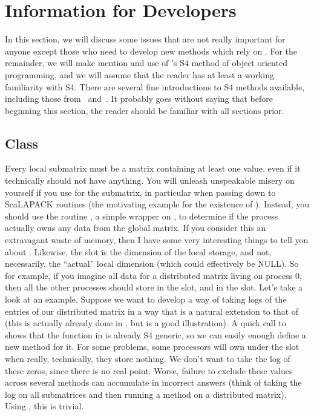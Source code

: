\section[]{Information for Developers}
\label{sec:devs}

In this section, we will discuss some issues that are not really important for anyone except those who need to develop new methods which rely on .  For the remainder, we will make mention and use of 's S4 method of object oriented programming, and we will assume that the reader has at least a working familiarity with S4.  There are several fine introductions to S4 methods available, including those from~\citep{s4chambers} and~\citep{s4notsoshort}.  It probably goes without saying that before beginning this section, the reader should be familiar with all sections prior.

\subsection[]{Class }
\label{sec:ictxt}

Every local submatrix must be a matrix containing at least one value, even if it technically should not have anything.  You will unleash unspeakable misery on yourself if you use  for the submatrix, in particular when passing down to ScaLAPACK routines (the motivating example for the existence of ).  Instead, you should use the routine , a simple wrapper on , to determine if the process actually owns any data from the global matrix.  If you consider this an extravagant waste of memory, then I have some very interesting things to tell you about .
\np
Likewise, the slot  is the dimension of the local storage, and not, necessarily, the ``actual'' local dimension (which could effectively be NULL).  So for example, if you imagine all data for a distributed matrix living on process 0, then all the other processes should store  in the  slot, and  in the  slot.
\np
Let's take a look at an example.  Suppose we want to develop a way of taking logs of the entries of our distributed matrix in a way that is a natural extension to that of  (this is actually already done in , but is a good illustration).  A quick call to  shows that the function  in  is already S4 generic, so we can easily enough define a new method for it.
\np
For some problems, some processors will own  under the  slot when really, technically, they store nothing.  We don't want to take the log of these zeros, since there is no real point.  Worse, failure to exclude these values across several methods can accumulate in incorrect answers (think of taking the log on all submatrices and then running a  method on a distributed matrix).  Using , this is trivial.

